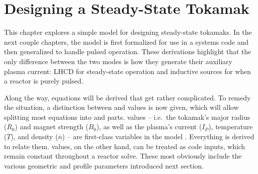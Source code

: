%
%
%
%
%
%
%
%

\chapter{Designing a Steady-State Tokamak}

This chapter explores a simple model for designing steady-state tokamaks. In the next couple chapters, the model is first formalized for use in a systems code and then generalized to handle pulsed operation. These derivations highlight that the only difference between the two modes  is how they generate their auxiliary plasma current: LHCD for steady-state operation and inductive sources for when a reactor is purely pulsed.

Along the way, equations will be derived that get rather complicated. To remedy the situation, a distinction between  and  values is now given, which will allow splitting most equations into  and  parts.  values -- i.e.\ the tokamak's major radius ($R_0$) and magnet strength ($B_0$), as well as the plasma's current ($I_P$), temperature ($\overline T$), and density ($\overline n$) -- are first-class variables in the model . Everything is derived to relate them.  values, on the other hand, can be treated as code inputs, which remain constant throughout a reactor solve.  These most obviously include the various geometric and profile parameters introduced next section.


